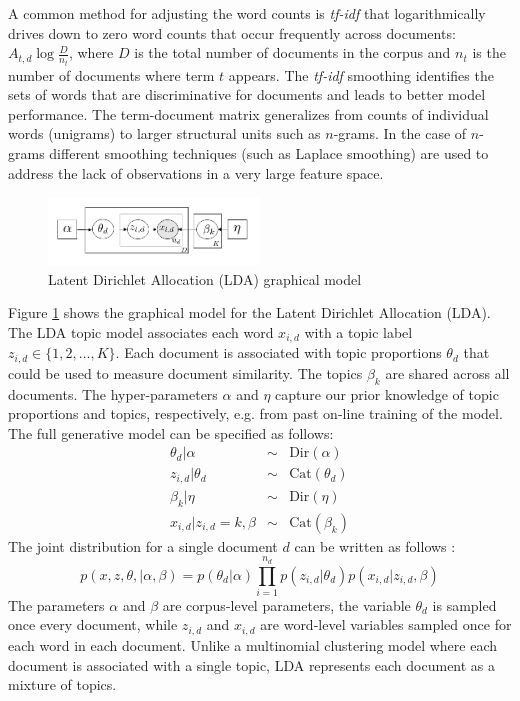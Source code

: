 A common method for adjusting the word counts is \textit{tf-idf} that logarithmically drives down to zero word counts that occur frequently across documents: $A_{t,d} \log \frac{D}{n_t}$, where $D$ is the total number of documents in the corpus and $n_t$ is the number of documents where term $t$ appears. The \textit{tf-idf} smoothing identifies the sets of words that are discriminative for documents and leads to better model performance. The term-document matrix generalizes from counts of individual words (unigrams) to larger structural units such as $n$-grams. In the case of $n$-grams different smoothing techniques (such as Laplace smoothing) are used to address the lack of observations in a very large feature space.\\ 

\begin{figure}[tbhp]
    \centering
    \includegraphics[width=0.5\textwidth, trim={10 10 10 10}]{figures/lda_gm.png}
    \caption{Latent Dirichlet Allocation (LDA) graphical model}
    \label{fig:lda_gm}
\end{figure}

Figure \ref{fig:lda_gm} shows the graphical model for the Latent Dirichlet Allocation (LDA). The LDA topic model associates each word $x_{i,d}$ with a topic label $z_{i,d} \in \{1,2,...,K\}$. Each document is associated with topic proportions $\theta_d$ that could be used to measure document similarity. The topics $\beta_k$ are shared across all documents. The hyper-parameters $\alpha$ and $\eta$ capture our prior knowledge of topic proportions and topics, respectively, e.g. from past on-line training of the model. The full generative model can be specified as follows:
\begin{eqnarray}
    \theta_d | \alpha &\sim& \mathrm{Dir}(\alpha)\\
    z_{i,d} | \theta_d &\sim& \mathrm{Cat}(\theta_d)\\
    \beta_k | \eta &\sim& \mathrm{Dir}(\eta)\\
    x_{i,d}|z_{i,d}=k,\beta &\sim& \mathrm{Cat}(\beta_k)
\end{eqnarray}
The joint distribution for a single document $d$ can be written as follows \cite{Blei2003}:
\begin{equation}
    p(x,z,\theta,|\alpha,\beta) = p(\theta_d|\alpha)\prod_{i=1}^{n_d}p(z_{i,d}|\theta_d)p(x_{i,d}|z_{i,d},\beta) 
\end{equation}
The parameters $\alpha$ and $\beta$ are corpus-level parameters, the variable $\theta_d$ is sampled once every document, while $z_{i,d}$ and $x_{i,d}$ are word-level variables sampled once for each word in each document. Unlike a multinomial clustering model where each document is associated with a single topic, LDA represents each document as a mixture of topics.\\

